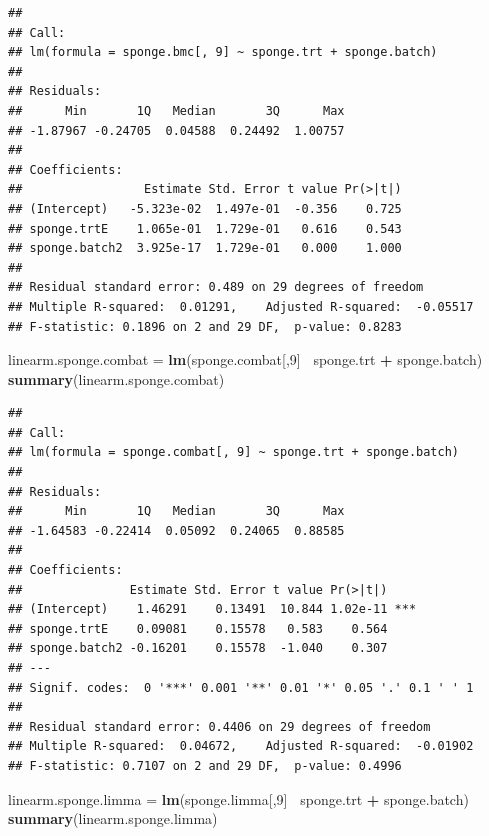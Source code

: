 \documentclass[]{book}
\newenvironment{Shaded}{\begin{snugshade}}{\end{snugshade}}
\newcommand{\KeywordTok}[1]{\textcolor[rgb]{0.13,0.29,0.53}{\textbf{#1}}}
\newcommand{\DecValTok}[1]{\textcolor[rgb]{0.00,0.00,0.81}{#1}}
\newcommand{\StringTok}[1]{\textcolor[rgb]{0.31,0.60,0.02}{#1}}
\newcommand{\OperatorTok}[1]{\textcolor[rgb]{0.81,0.36,0.00}{\textbf{#1}}}
\newcommand{\NormalTok}[1]{#1}
\begin{document}
\begin{verbatim}
## 
## Call:
## lm(formula = sponge.bmc[, 9] ~ sponge.trt + sponge.batch)
## 
## Residuals:
##      Min       1Q   Median       3Q      Max 
## -1.87967 -0.24705  0.04588  0.24492  1.00757 
## 
## Coefficients:
##                 Estimate Std. Error t value Pr(>|t|)
## (Intercept)   -5.323e-02  1.497e-01  -0.356    0.725
## sponge.trtE    1.065e-01  1.729e-01   0.616    0.543
## sponge.batch2  3.925e-17  1.729e-01   0.000    1.000
## 
## Residual standard error: 0.489 on 29 degrees of freedom
## Multiple R-squared:  0.01291,    Adjusted R-squared:  -0.05517 
## F-statistic: 0.1896 on 2 and 29 DF,  p-value: 0.8283
\end{verbatim}

\begin{Shaded}
\begin{Highlighting}[]
\NormalTok{linearm.sponge.combat =}\StringTok{ }\KeywordTok{lm}\NormalTok{(sponge.combat[,}\DecValTok{9}\NormalTok{]}\OperatorTok{~}\StringTok{ }\NormalTok{sponge.trt }\OperatorTok{+}\StringTok{ }\NormalTok{sponge.batch)}
\KeywordTok{summary}\NormalTok{(linearm.sponge.combat)}
\end{Highlighting}
\end{Shaded}

\begin{verbatim}
## 
## Call:
## lm(formula = sponge.combat[, 9] ~ sponge.trt + sponge.batch)
## 
## Residuals:
##      Min       1Q   Median       3Q      Max 
## -1.64583 -0.22414  0.05092  0.24065  0.88585 
## 
## Coefficients:
##               Estimate Std. Error t value Pr(>|t|)    
## (Intercept)    1.46291    0.13491  10.844 1.02e-11 ***
## sponge.trtE    0.09081    0.15578   0.583    0.564    
## sponge.batch2 -0.16201    0.15578  -1.040    0.307    
## ---
## Signif. codes:  0 '***' 0.001 '**' 0.01 '*' 0.05 '.' 0.1 ' ' 1
## 
## Residual standard error: 0.4406 on 29 degrees of freedom
## Multiple R-squared:  0.04672,    Adjusted R-squared:  -0.01902 
## F-statistic: 0.7107 on 2 and 29 DF,  p-value: 0.4996
\end{verbatim}

\begin{Shaded}
\begin{Highlighting}[]
\NormalTok{linearm.sponge.limma =}\StringTok{ }\KeywordTok{lm}\NormalTok{(sponge.limma[,}\DecValTok{9}\NormalTok{]}\OperatorTok{~}\StringTok{ }\NormalTok{sponge.trt }\OperatorTok{+}\StringTok{ }\NormalTok{sponge.batch)}
\KeywordTok{summary}\NormalTok{(linearm.sponge.limma)}
\end{Highlighting}
\end{Shaded}
\end{document}
